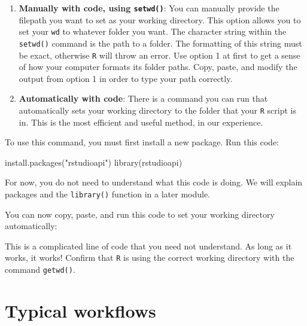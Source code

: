 \documentclass[
]{book}
\newenvironment{Shaded}{\begin{snugshade}}{\end{snugshade}}
\newcommand{\FunctionTok}[1]{\textcolor[rgb]{0.00,0.00,0.00}{#1}}
\newcommand{\NormalTok}[1]{#1}
\newcommand{\SpecialCharTok}[1]{\textcolor[rgb]{0.00,0.00,0.00}{#1}}
\newcommand{\StringTok}[1]{\textcolor[rgb]{0.31,0.60,0.02}{#1}}
\begin{document}
\begin{enumerate}
\def\labelenumi{\arabic{enumi}.}
\setcounter{enumi}{1}
\item
  \textbf{Manually with code, using \texttt{setwd()}}: You can manually provide the filepath you want to set as your working directory. This option allows you to set your \texttt{wd} to whatever folder you want. The character string within the \texttt{setwd()} command is the path to a folder. The formatting of this string must be exact, otherwise \texttt{R} will throw an error. Use option 1 at first to get a sense of how your computer formats its folder paths. Copy, paste, and modify the output from option 1 in order to type your path correctly.
\item
  \textbf{Automatically with code}: There is a command you can run that automatically sets your working directory to the folder that your \texttt{R} script is in. This is the most efficient and useful method, in our experience.
\end{enumerate}

To use this command, you must first install a new package. Run this code:

\begin{Shaded}
\begin{Highlighting}[]
\FunctionTok{install.packages}\NormalTok{(}\StringTok{"rstudioapi"}\NormalTok{)}
\FunctionTok{library}\NormalTok{(rstudioapi)}
\end{Highlighting}
\end{Shaded}

For now, you do not need to understand what this code is doing. We will explain packages and the \texttt{library()} function in a later module.

You can now copy, paste, and run this code to set your working directory automatically:

\begin{Shaded}
\end{Shaded}

This is a complicated line of code that you need not understand. As long as it works, it works! Confirm that \texttt{R} is using the correct working directory with the command \texttt{getwd()}.

\hypertarget{typical-workflows}{%
\section*{Typical workflows}\label{typical-workflows}}
\end{document}
